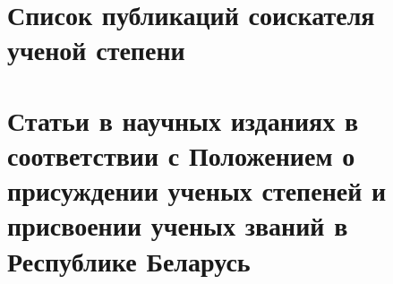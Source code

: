 







\newpage
\section*{Список публикаций соискателя ученой степени}

\renewcommand{\labelenumi}{\arabic{enumi}--A}
\renewcommand{\theenumi}{\arabic{enumi}--A}

\vspace{-4ex}
\section*{\fontsize{14}{15}\selectfont Статьи в научных изданиях в соответствии с Положением о присуждении ученых степеней и присвоении ученых званий в Республике Беларусь}
\vspace{-4ex}

